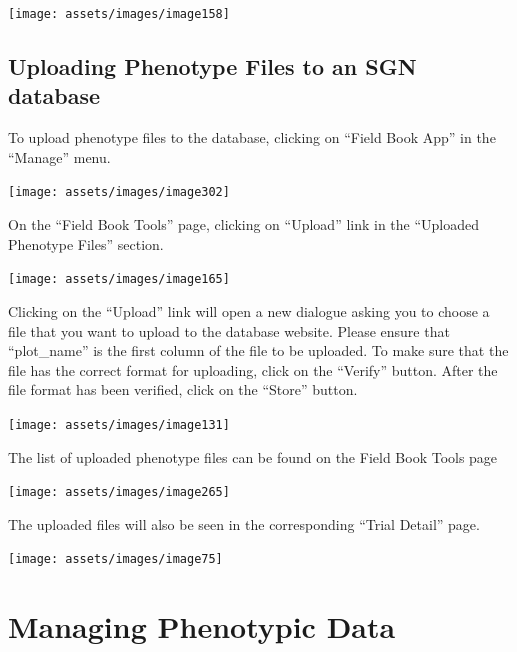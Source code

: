 \documentclass[
  12pt,
]{book}
\begin{document}
\begin{center}\texttt{[image: assets/images/image158]} \end{center}

\hypertarget{uploading-pheno-files}{%
\section{Uploading Phenotype Files to an SGN database}\label{uploading-pheno-files}}

To upload phenotype files to the database, clicking on ``Field Book App'' in the ``Manage'' menu.

\begin{center}\texttt{[image: assets/images/image302]} \end{center}

On the ``Field Book Tools'' page, clicking on ``Upload'' link in the ``Uploaded Phenotype Files'' section.

\begin{center}\texttt{[image: assets/images/image165]} \end{center}

Clicking on the ``Upload'' link will open a new dialogue asking you to choose a file that you want to upload to the database website. Please ensure that ``plot\_name'' is the first column of the file to be uploaded. To make sure that the file has the correct format for uploading, click on the ``Verify'' button. After the file format has been verified, click on the ``Store'' button.

\begin{center}\texttt{[image: assets/images/image131]} \end{center}

The list of uploaded phenotype files can be found on the Field Book Tools page

\begin{center}\texttt{[image: assets/images/image265]} \end{center}

The uploaded files will also be seen in the corresponding ``Trial Detail'' page.

\begin{center}\texttt{[image: assets/images/image75]} \end{center}

\hypertarget{managing-phenotypic-data}{%
\chapter{Managing Phenotypic Data}\label{managing-phenotypic-data}}
\end{document}
